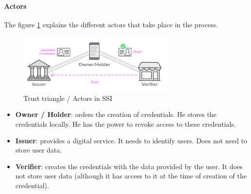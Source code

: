 \documentclass[a4paper, 12pt]{article} %
\begin{document}
                \paragraph{Actors}
                    The figure \ref{fig:trust-triangle} explains the different actors\cite{ssi-guide} that take place in the process.
                    \begin{figure}[h]
                        \centering
                        \includegraphics[width=0.7\textwidth]{trust-triangle.png}
                        \caption{Trust triangle / Actors in SSI}
                        \label{fig:trust-triangle}
                    \end{figure}
                    \begin{itemize}
                        \item \textbf{Owner / Holder}: orders the creation of credentials. He stores the credentials locally. He has the power to revoke access to these credentials.
                        \item \textbf{Issuer}: provides a digital service. It needs to identify users. Does not need to store user data.
                        \item \textbf{Verifier}: creates the credentials with the data provided by the user. It does not store user data (although it has access to it at the time of creation of the credential).
                    \end{itemize}
            
\end{document}
